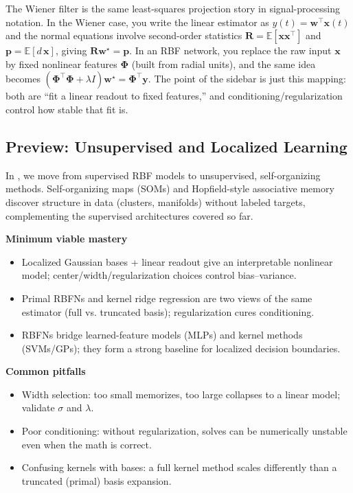 
\begin{tcolorbox}[summarybox, title={Sidebar (optional): Wiener filtering in one paragraph}]
The Wiener filter is the same least-squares projection story in signal-processing notation. In the Wiener case, you write the linear estimator as \(y(t)=\mathbf{w}^\top\mathbf{x}(t)\) and the normal equations involve second-order statistics \(\mathbf{R}=\mathbb{E}[\mathbf{x}\mathbf{x}^\top]\) and \(\mathbf{p}=\mathbb{E}[d\,\mathbf{x}]\), giving \(\mathbf{R}\mathbf{w}^\star=\mathbf{p}\). In an RBF network, you replace the raw input \(\mathbf{x}\) by fixed nonlinear features \(\boldsymbol{\Phi}\) (built from radial units), and the same idea becomes \((\boldsymbol{\Phi}^\top\boldsymbol{\Phi}+\lambda I)\mathbf{w}^\star=\boldsymbol{\Phi}^\top\mathbf{y}\). The point of the sidebar is just this mapping: both are ``fit a linear readout to fixed features,'' and conditioning/regularization control how stable that fit is.
\end{tcolorbox}

\subsection{Preview: Unsupervised and Localized Learning}
\label{sec:rbf_preview_unsupervised_and_localized_learning}

In , we move from supervised RBF models to unsupervised, self-organizing methods. Self-organizing maps (SOMs) and Hopfield-style associative memory discover structure in data (clusters, manifolds) without labeled targets, complementing the supervised architectures covered so far.

\begin{tcolorbox}[summarybox, title={Key takeaways}]
\textbf{Minimum viable mastery}
\begin{itemize}
    \item Localized Gaussian bases + linear readout give an interpretable nonlinear model; center/width/regularization choices control bias--variance.
    \item Primal RBFNs and kernel ridge regression are two views of the same estimator (full vs. truncated basis); regularization cures conditioning.
    \item RBFNs bridge learned-feature models (MLPs) and kernel methods (SVMs/GPs); they form a strong baseline for localized decision boundaries.
\end{itemize}
\medskip
\textbf{Common pitfalls}
\begin{itemize}
    \item Width selection: too small memorizes, too large collapses to a linear model; validate \(\sigma\) and \(\lambda\).
    \item Poor conditioning: without regularization, solves can be numerically unstable even when the math is correct.
    \item Confusing kernels with bases: a full kernel method scales differently than a truncated (primal) basis expansion.
\end{itemize}
\end{tcolorbox}


